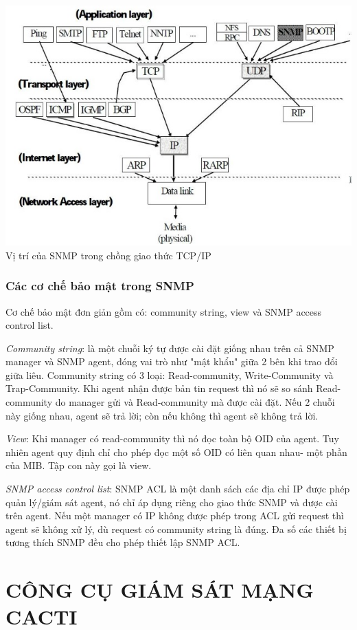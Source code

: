 \documentclass[12pt,oneside,a4paper,reqno]{report}
\begin{document}
\begin{large}
\begin{center}
	\includegraphics[scale=0.8]{images/giaotiepsnmp3.jpg}\\
	Vị trí của SNMP trong chồng giao thức TCP/IP
\end{center}

\subsection{Các cơ chế bảo mật trong SNMP}
Cơ chế bảo mật đơn giản gồm có: community string, view và SNMP access control list.

{\it Community string}: là một chuỗi ký tự được cài đặt giống nhau trên cả SNMP manager và SNMP agent, đóng vai trò như "mật khẩu" giữa 2 bên khi trao đổi giữa liêu. Community string có 3 loại: Read-community, Write-Community và Trap-Community. Khi agent nhận được bản tin request thì nó sẽ so sánh Read-community do manager gửi và Read-community mà được cài đặt. Nếu 2 chuỗi này giống nhau, agent sẽ trả lời; còn nếu không thì agent sẽ không trả lời.

{\it View}: Khi manager có read-community thì nó đọc toàn bộ OID của agent. Tuy nhiên agent quy định chỉ cho phép đọc một số OID có liên quan nhau- một phần của MIB. Tập con này gọi là view.

{\it SNMP access control list}: SNMP ACL là một danh sách các địa chỉ IP được phép quản lý/giám sát agent, nó chỉ áp dụng riêng cho giao thức SNMP và được cài trên agent. Nếu một manager có IP không được phép trong ACL gửi request thì agent sẽ không xử lý, dù request có community string là đúng. Đa số các thiết bị tương thích SNMP đều cho phép thiết lập SNMP ACL.
\chapter{CÔNG CỤ GIÁM SÁT MẠNG CACTI}

\end{large}
\end{document}
